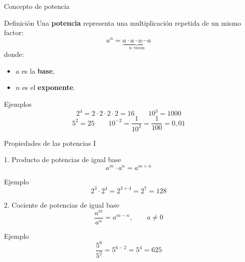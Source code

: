 \documentclass[aspectratio=169,10pt,handout]{beamer}
\newcommand{\destacar}[1]{\textcolor{USTBlueDark}{\textbf{#1}}}
\newcommand{\pp}{\pause}
\begin{document}
	\begin{frame}{Concepto de potencia}
		\begin{block}{Definición}
			Una \destacar{potencia} representa una multiplicación repetida de un mismo factor:
			\[
			a^n=\underbrace{a\cdot a\cdot a\cdots a}_{n \text{ veces}}
			\]
			donde:
			\begin{itemize}
				\item \(a\) es la \destacar{base},
				\item \(n\) es el \destacar{exponente}.
			\end{itemize}
		\end{block}
		
		\pp
		
		\begin{exampleblock}{Ejemplos}
			\[
			2^4 = 2\cdot2\cdot2\cdot2 = 16
			\qquad
			10^3 = 1000
			\]
			\[
			5^2 = 25
			\qquad
			10^{-2}=\frac{1}{10^2}=\frac{1}{100}=0{,}01
			\]
		\end{exampleblock}
	\end{frame}
	
	\begin{frame}{Propiedades de las potencias I}
		\begin{block}{1. Producto de potencias de igual base}
			\[
			a^m \cdot a^n = a^{m+n}
			\]
		\end{block}
		
		\begin{exampleblock}{Ejemplo}
			\[
			2^3\cdot2^4 = 2^{3+4}=2^7=128
			\]
		\end{exampleblock}
		
		\pause
		
		\begin{block}{2. Cociente de potencias de igual base}
			\[
			\frac{a^m}{a^n}=a^{m-n}, \qquad a\neq 0
			\]
		\end{block}
		
		\begin{exampleblock}{Ejemplo}
			\[
			\frac{5^6}{5^2}=5^{6-2}=5^4=625
			\]
		\end{exampleblock}
	\end{frame}
	
\end{document}
